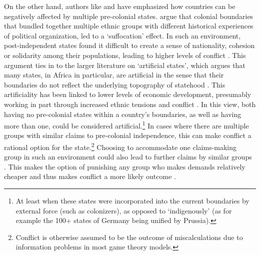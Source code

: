 \documentclass[12pt]{article}
\begin{document}
On the other hand, authors like \citet{Englebert2002} and \citet{Alesina2011}
have emphasized how countries can be negatively affected by multiple
pre-colonial states. \citet{Englebert2002} argue that colonial boundaries that
bundled together multiple ethnic groups with different historical experiences of
political organization, led to a `suffocation' effect. In such an environment,
post-independent states found it difficult to create a sense of nationality,
cohesion or solidarity among their populations, leading to higher levels of
conflict \citep{Englebert2002}. This argument ties in to the larger literature
on `artificial states', which argues that many states, in Africa in particular,
are artificial in the sense that their boundaries do not reflect the underlying
topography of statehood \citep{Alesina2011, Clapham1996, Jackson1991}. This
artificiality has been linked to lower levels of economic development,
presumably working in part through increased ethnic tensions and conflict
\citep{Alesina2011}. In this view, both having no pre-colonial states within a
country's boundaries, as well as having more than one, could be considered
artificial.\footnote{At least when these states were incorporated into the
current boundaries by external force (such as colonizers), as opposed to
`indigenously' (as for example the 100+ states of Germany being unified by
Prussia).} In cases where there are multiple groups with similar claims to
pre-colonial independence, this can make conflict a rational option for the
state.\footnote{Conflict is otherwise assumed to be the outcome of
miscalculations due to information problems in most game theory models.}
Choosing to accommodate one claims-making group in such an environment could
also lead to further claims by similar groups \citep{Walter2009}. This makes the
option of punishing any group who makes demands relatively cheaper and thus
makes conflict a more likely outcome \citep{Wishman_2022}.
\end{document}

